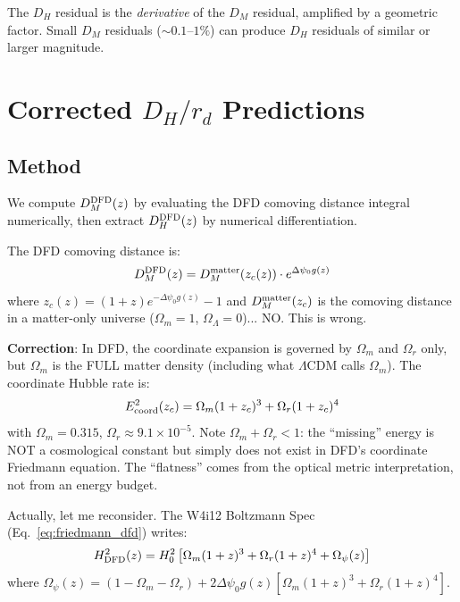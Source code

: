 \documentclass[11pt,a4paper]{article}
\newcommand{\Omm}{\Omega_m}
\newcommand{\OmL}{\Omega_\Lambda}
\newcommand{\LCDM}{$\Lambda$CDM}
\begin{document}
The $D_H$ residual is the \emph{derivative} of the $D_M$ residual,
amplified by a geometric factor. Small $D_M$ residuals ($\sim 0.1$--$1\%$)
can produce $D_H$ residuals of similar or larger magnitude.


\section{Corrected $D_H/r_d$ Predictions}
\label{sec:corrected-table}

\subsection{Method}

We compute $D_M^{\rm DFD}(z)$ by evaluating the DFD comoving distance
integral numerically, then extract $D_H^{\rm DFD}(z)$ by numerical
differentiation.

The DFD comoving distance is:
\begin{equation}
D_M^{\rm DFD}(z) = D_M^{\rm matter}(z_c(z)) \cdot e^{\Delta\psi_0 g(z)}
\end{equation}
where $z_c(z) = (1+z)e^{-\Delta\psi_0 g(z)} - 1$ and
$D_M^{\rm matter}(z_c)$ is the comoving distance in a matter-only
universe ($\Omm = 1$, $\OmL = 0$)... NO. This is wrong.

\textbf{Correction}: In DFD, the coordinate expansion is governed by
$\Omm$ and $\Omega_r$ only, but $\Omm$ is the FULL matter density
(including what \LCDM{} calls $\Omm$). The coordinate Hubble rate is:
\begin{equation}
E_{\rm coord}^2(z_c) = \Omm(1+z_c)^3 + \Omega_r(1+z_c)^4
\end{equation}
with $\Omm = 0.315$, $\Omega_r \approx 9.1 \times 10^{-5}$. Note
$\Omm + \Omega_r < 1$: the ``missing'' energy is NOT a cosmological
constant but simply does not exist in DFD's coordinate Friedmann
equation. The ``flatness'' comes from the optical metric interpretation,
not from an energy budget.

Actually, let me reconsider. The W4i12 Boltzmann Spec
(Eq.~\eqref{eq:friedmann_dfd}) writes:
\begin{equation}
H_{\rm DFD}^2(z) = H_0^2\left[\Omm(1+z)^3 + \Omega_r(1+z)^4
+ \Omega_\psi(z)\right]
\end{equation}
where $\Omega_\psi(z) = (1 - \Omm - \Omega_r) + 2\Delta\psi_0 g(z)
[\Omm(1+z)^3 + \Omega_r(1+z)^4]$.
\end{document}
